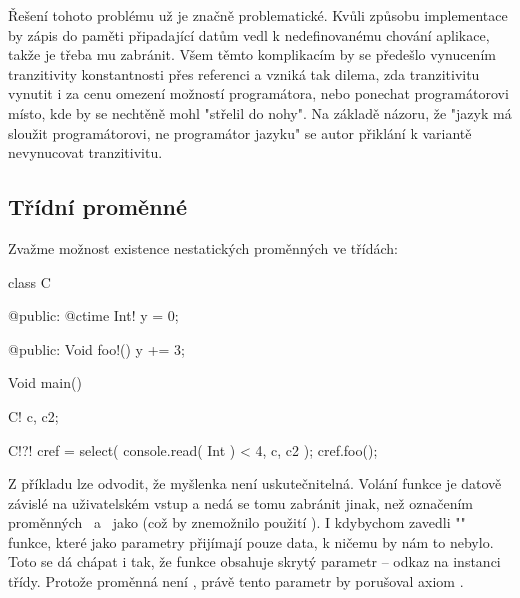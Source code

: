 Řešení tohoto problému už je značně problematické. Kvůli způsobu implementace by zápis do paměti připadající \ctime datům vedl k nedefinovanému chování aplikace, takže je třeba mu zabránit. Všem těmto komplikacím by se předešlo vynucením tranzitivity konstantnosti přes referenci a vzniká tak dilema, zda tranzitivitu vynutit i za cenu omezení možností programátora, nebo ponechat programátorovi místo, kde by se nechtěně mohl "střelil do nohy". Na základě názoru, že "jazyk má sloužit programátorovi, ne programátor jazyku" se autor přiklání k variantě nevynucovat tranzitivitu.

\subsection{Třídní \ctime proměnné}
Zvažme možnost existence nestatických \ctime proměnných ve třídách: \nopagebreak

\begin{code}
class C {
	
@public:
	@ctime Int! y = 0;
	
@public:
	Void foo!() {
		y += 3;
	}
	
}

Void main() {
	C! c, c2;
	
	C!?! cref = select( console.read( Int ) < 4, c, c2 );
	cref.foo();
}
\end{code}

Z příkladu lze odvodit, že myšlenka není uskutečnitelná. Volání funkce  je datově závislé na uživatelském vstup a nedá se tomu zabránit jinak, než označením proměnných ~a~ jako \ctime (což by znemožnilo použití ). I kdybychom zavedli "\ctimeNoXSpace" funkce, které jako parametry přijímají pouze \ctime data, k ničemu by nám to nebylo. Toto se dá chápat i tak, že funkce  obsahuje skrytý parametr -- odkaz na instanci třídy. Protože proměnná  není \ctime, právě tento parametr by porušoval axiom \ctime.

